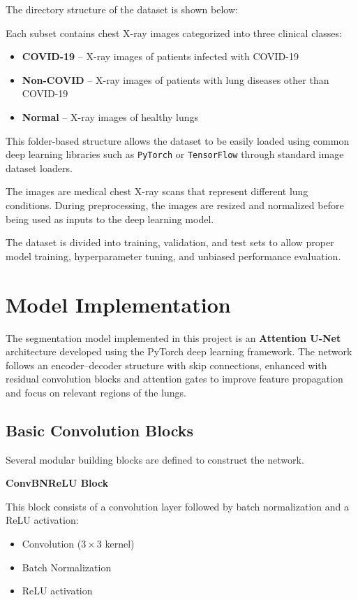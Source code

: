\documentclass[10pt,twocolumn]{article}
\begin{document}
The directory structure of the dataset is shown below:

Each subset contains chest X-ray images categorized into three clinical classes:

\begin{itemize}
\item \textbf{COVID-19} – X-ray images of patients infected with COVID-19
\item \textbf{Non-COVID} – X-ray images of patients with lung diseases other than COVID-19
\item \textbf{Normal} – X-ray images of healthy lungs
\end{itemize}

This folder-based structure allows the dataset to be easily loaded using common 
deep learning libraries such as \texttt{PyTorch} or \texttt{TensorFlow} through 
standard image dataset loaders.

The images are medical chest X-ray scans that represent different lung conditions. 
During preprocessing, the images are resized and normalized before being used as 
inputs to the deep learning model.

The dataset is divided into training, validation, and test sets to allow proper 
model training, hyperparameter tuning, and unbiased performance evaluation.


\section{Model Implementation}

The segmentation model implemented in this project is an \textbf{Attention U-Net} architecture 
developed using the PyTorch deep learning framework. The network follows an encoder–decoder 
structure with skip connections, enhanced with residual convolution blocks and attention gates 
to improve feature propagation and focus on relevant regions of the lungs.

\subsection{Basic Convolution Blocks}

Several modular building blocks are defined to construct the network.

\textbf{ConvBNReLU Block}

This block consists of a convolution layer followed by batch normalization and a ReLU activation:

\begin{itemize}
\item Convolution ($3\times3$ kernel)
\item Batch Normalization
\item ReLU activation
\end{itemize}
\end{document}
